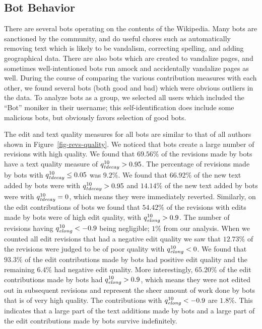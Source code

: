 \subsection{Bot Behavior}

There are several bots operating on the contents of the Wikipedia.
Many bots are sanctioned by the community, and do useful
chores such as automatically removing text which is likely
to be vandalism, correcting spelling, and adding geographical data.
There are also bots which are created to vandalize pages,
and sometimes well-intentioned bots run amock and
accidentally vandalize pages as well.
During the course of comparing the various contribution
measures with each other, we found several bots (both
good and bad) which were obvious outliers in the data.
To analyze bots as a group, we selected all users
which included the ``Bot'' moniker in their username;
this self-identification does include some malicious bots,
but obviously favors selection of good bots.

The edit and text quality measures for all bots are similar to
that of all authors shown in Figure~\ref{fig-revs-quality}.
We noticed that bots create a large number of revisions with
high quality.
We found that $69.56\%$ of the revisions made by
bots have a text quality measure of $\quality{tdecay}{10}{} > 0.95$.
The percentage of revisions made by bots with 
$\quality{tdecay}{10}{} \le 0.05$ was $9.2\%$.
We found that $66.92\%$ of the new text added by bots were with
$\quality{tdecay}{10}{} > 0.95$ and $14.14\%$ of the new text added by
bots were with $\quality{tdecay}{10}{} = 0$, which means they were 
immediately reverted.
Similarly, on the edit contributions of bots we found that
$54.42\%$ of the revisions with edits made by bots were of
high edit quality, with $\quality{elong}{10}{} > 0.9$.
The number of revisions having $\quality{elong}{10}{} < -0.9$ being
negligible; $1\%$ from our analysis.
When we counted all edit revisions that had a negative edit
quality we saw that $12.73\%$ of the revisions were judged to 
be of poor quality with $\quality{elong}{10}{} < 0$.
We found that $93.3\%$ of the edit contributions made by bots
had positive edit quality and the remaining $6.4\%$ had
negative edit quality.
More interestingly, $65.20\%$ of the edit contributions made
by bots had $\quality{elong}{10}{} > 0.9$, which means they were
not edited out in subsequent revisions and represent the
sheer amount of work done by bots that is of very high quality.
The contributions with $\quality{elong}{10}{} < -0.9$ are $1.8\%$.
This indicates that a large part of the text additions made by bots 
and a large part of the edit contributions made by bots survive
indefinitely.

